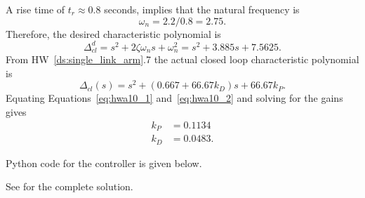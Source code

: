 A rise time of $t_r\approx 0.8$ seconds, implies that the natural frequency is
\[
\omega_n = 2.2/0.8 = 2.75.
\]
Therefore, the desired characteristic polynomial is
\begin{equation}\label{eq:hwa10_1}
\Delta_{cl}^d = s^2 + 2\zeta\omega_n s + \omega_n^2 = s^2 + 3.885 s + 7.5625.
\end{equation}
From HW~\ref{ds:single_link_arm}.7 the actual closed loop characteristic polynomial is
\begin{equation}\label{eq:hwa10_2}
\Delta_{cl}(s) = s^2 + (0.667 + 66.67k_D)s + 66.67k_P.
\end{equation}
Equating Equations~\eqref{eq:hwa10_1} and~\eqref{eq:hwa10_2} and solving for the gains gives
\begin{align*}
k_P &=  0.1134 \\
k_D &= 0.0483.
\end{align*}

Python code for the controller is given below.



See  for the complete solution.
